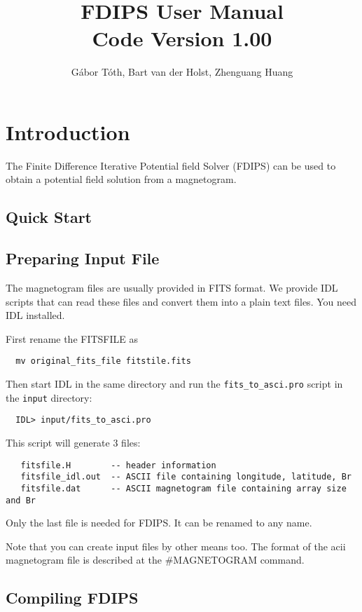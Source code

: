 \documentclass[12pt]{article}
\title{FDIPS User Manual \\ \large Code Version 1.00}
\author{G\'abor T\'oth, Bart van der Holst, Zhenguang Huang}
\begin{document}
\maketitle

\section{Introduction}

The Finite Difference Iterative Potential field Solver (FDIPS) can be
used to obtain a potential field solution from a magnetogram.

\subsection{Quick Start}



\subsection{Preparing Input File}

The magnetogram files are usually provided in FITS format. We provide
IDL scripts that can read these files and convert them into a plain
text files. You need IDL installed. 

First rename the FITSFILE as
\begin{verbatim}
  mv original_fits_file fitstile.fits
\end{verbatim}
Then start IDL in the same directory and run the {\tt fits\_to\_asci.pro}
script in the {\tt input} directory:
\begin{verbatim}
  IDL> input/fits_to_asci.pro
\end{verbatim}
This script will generate 3 files:
\begin{verbatim}
   fitsfile.H        -- header information
   fitsfile_idl.out  -- ASCII file containing longitude, latitude, Br
   fitsfile.dat      -- ASCII magnetogram file containing array size and Br
\end{verbatim}
Only the last file is needed for FDIPS. It can be renamed to any name.

Note that you can create input files by other means too. The format of the
acii magnetogram file is described at the \#MAGNETOGRAM command.

\subsection{Compiling FDIPS}
\end{document}
